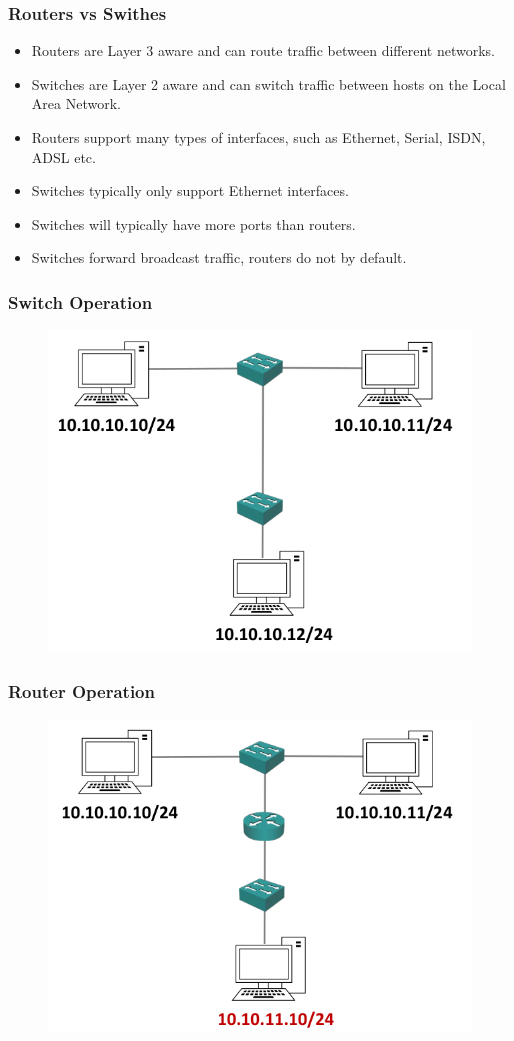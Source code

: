 \documentclass[pdflatex,compress,mathserif]{beamer}
\begin{document}
\begin{frame}
	\frametitle{Routers vs Swithes}
	\begin{itemize}
		\item Routers are Layer 3 aware and can route traffic between different networks.
		\item Switches are Layer 2 aware and can switch traffic between hosts on the Local Area Network.
		\item Routers support many types of interfaces, such as Ethernet, Serial, ISDN, ADSL etc.
		\item Switches typically only support Ethernet interfaces.
		\item Switches will typically have more ports than routers.
		\item Switches forward broadcast traffic, routers do not by default.
	\end{itemize}
\end{frame}

\begin{frame}
	\frametitle{Switch Operation}
	\begin{figure}
		\centering
		\includegraphics[width=0.8\linewidth]{img/img30}
	\end{figure}
\end{frame}

\begin{frame}
	\frametitle{Router Operation}
	\begin{figure}
		\centering
		\includegraphics[width=0.8\linewidth]{img/img31}
	\end{figure}
\end{frame}
\end{document}
